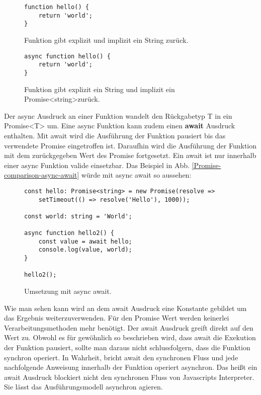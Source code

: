 \begin{figure}[H]
\begin{lstlisting}[basicstyle=\small]
function hello() {
    return 'world';
}
\end{lstlisting}
\caption{Funktion gibt explizit und implizit ein String zurück.}
\end{figure}

\begin{figure}[H]
\begin{lstlisting}[basicstyle=\small]
async function hello() {
    return 'world';
}
\end{lstlisting}
\caption{Funktion gibt explizit ein String und implizit ein Promise\textless string\textgreater zurück.}
\end{figure}

\noindent
Der async Ausdruck an einer Funktion wandelt den Rückgabetyp T in ein Promise\textless T\textgreater{} um. Eine async Funktion kann zudem einen \textbf{await} Ausdruck enthalten. Mit await wird die Ausführung der Funktion pausiert bis das verwendete Promise eingetroffen ist. Daraufhin wird die Ausführung der Funktion mit dem zurückgegeben Wert des Promise fortgesetzt. Ein await ist nur innerhalb einer async Funktion valide einsetzbar. Das Beispiel in Abb. \ref{Promise-comparison-async-await} würde mit async await so aussehen:

\begin{figure}[H]
\begin{lstlisting}[basicstyle=\small]
const hello: Promise<string> = new Promise(resolve =>
    setTimeout(() => resolve('Hello'), 1000));
    
const world: string = 'World';

async function hello2() {
    const value = await hello;
    console.log(value, world);
}

hello2();
\end{lstlisting}
\caption{Umsetzung mit async await.}
\end{figure}

\noindent
Wie man sehen kann wird an dem await Ausdruck eine Konstante gebildet um das Ergebnis weiterzuverwenden. Für den Promise Wert werden keinerlei Verarbeitungsmethoden mehr benötigt. Der await Ausdruck greift direkt auf den Wert zu. Obwohl es für gewöhnlich so beschrieben wird, dass await die Exekution der Funktion pausiert, sollte man daraus nicht schlussfolgern, dass die Funktion synchron operiert. In Wahrheit, bricht await den synchronen Fluss und jede nachfolgende Anweisung innerhalb der Funktion operiert asynchron. Das heißt ein await Ausdruck blockiert nicht den synchronen Fluss von Javascripts Interpreter. Sie lässt das Ausführungsmodell asynchron agieren.

